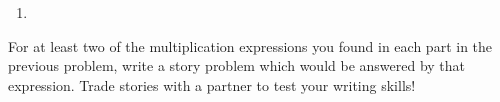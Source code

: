 \documentclass[nooutcomes,noauthor,handout]{ximera}
\begin{document}
\begin{problem}
\begin{enumerate}
{\begin{tabular}{p{0.5cm}p{0.5cm}p{0.5cm}p{0.5cm}p{0.5cm}p{0.5cm}p{0.5cm}p{0.5cm}p{0.5cm}p{0.5cm}p{0.5cm}}
        \end{tabular} }
    \item \leavevmode\vadjust{\vspace{-\baselineskip}}
\end{enumerate}
\end{problem}

\begin{problem}
 For at least two of the multiplication expressions you found in each part in the previous problem, write a story problem which would be answered by that expression.  Trade stories with a partner to test your writing skills!
\end{problem}
\end{document}
